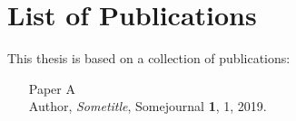 \chapter{List of Publications}

This thesis is based on a collection of publications:
\begin{enumerate}

\item[\color{blue}Paper A]\mbox{}\\ Author, \textit{Sometitle}, Somejournal \textbf{1}, 1, 2019.

\end{enumerate}
